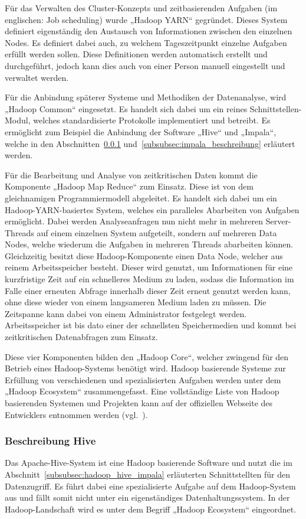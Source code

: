 Für das Verwalten des Cluster-Konzepts und zeitbasierenden Aufgaben (im
englischen: Job scheduling) wurde „Hadoop YARN“ gegründet. Dieses System
definiert eigenständig den Austausch von Informationen zwischen den einzelnen
Nodes. Es definiert dabei auch, zu welchem Tageszeitpunkt einzelne Aufgaben
erfüllt werden sollen. Diese Definitionen werden automatisch erstellt und
durchgeführt, jedoch kann dies auch von einer Person manuell eingestellt und
verwaltet werden.

Für die Anbindung späterer Systeme und Methodiken der Datenanalyse, wird
„Hadoop Common“ eingesetzt. Es handelt sich dabei um ein reines
Schnittstellen-Modul, welches standardisierte Protokolle implementiert und
betreibt. Es ermöglicht zum Beispiel die Anbindung der Software „Hive“ und
„Impala“, welche in den Abschnitten~\ref{subsubsec:hadoop_beschreibung}
und~\ref{subsubsec:impala_beschreibung} erläutert werden.

Für die Bearbeitung und Analyse von zeitkritischen Daten kommt die Komponente
„Hadoop Map Reduce“ zum Einsatz. Diese ist von dem gleichnamigen
Programmiermodell abgeleitet. Es handelt sich dabei um ein
Hadoop-YARN-basiertes System, welches ein paralleles Abarbeiten von Aufgaben
ermöglicht.  Dabei werden Analyseanfragen nun nicht mehr in mehreren
Server-Threads auf einem einzelnen System aufgeteilt, sondern auf mehreren Data
Nodes, welche wiederum die Aufgaben in mehreren Threads abarbeiten können.
Gleichzeitig besitzt diese Hadoop-Komponente einen Data Node, welcher aus
reinem Arbeitsspeicher besteht. Dieser wird genutzt, um Informationen für eine
kurzfristige Zeit auf ein schnelleres Medium zu laden, sodass die Information
im Falle einer erneuten Abfrage innerhalb dieser Zeit erneut genutzt werden
kann, ohne diese wieder von einem langsameren Medium laden zu müssen. Die
Zeitspanne kann dabei von einem Administrator festgelegt werden.
Arbeitsspeicher ist bis dato einer der schnellsten Speichermedien und kommt bei
zeitkritischen Datenabfragen zum Einsatz.

Diese vier Komponenten bilden den „Hadoop Core“, welcher zwingend für den
Betrieb eines Hadoop-Systems benötigt wird. Hadoop basierende Systeme zur
Erfüllung von verschiedenen und spezialisierten Aufgaben werden unter dem
„Hadoop Ecosystem“ zusammengefasst. Eine vollständige Liste von
Hadoop basierenden Systemen und Projekten kann auf der offiziellen Webseite des
Entwicklers entnommen werden (vgl.~\cite{Hadoop_related_projects}).
\nl%

\subsubsection{Beschreibung Hive}
\label{subsubsec:hadoop_beschreibung}
Das Apache-Hive-System ist eine Hadoop basierende Software und nutzt die im
Abschnitt~\ref{subsubsec:hadoop_hive_impala} erläuterten Schnittstellten für
den Datenzugriff. Es führt dabei eine spezialisierte Aufgabe auf dem
Hadoop-System aus und fällt somit nicht unter ein eigenständiges
Datenhaltungssystem. In der Hadoop-Landschaft wird es unter dem Begriff „Hadoop
Ecosystem“ eingeordnet.

